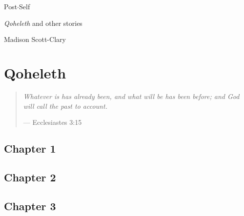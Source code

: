 \documentclass[11pt]{memoir}
\begin{document}
  \frontmatter

  

  \pagestyle{plain}

  \doublespacing

  \begin{flushright}
    \null
    \vfill
    {\Huge\DisplayFont Post$\cdot$Self}

    {\Large\DisplayFont \emph{Qoheleth} and other stories}

    \vfill

    {\Large\DisplayFont Madison Scott-Clary}
  \end{flushright}
  \thispagestyle{empty}

  \newpage

  

  \tableofcontents*
  \newpage
  \null
  \cleardoublepage

  \onehalfspacing


  \mainmatter

  \pagestyle{ourbook}

  \cleardoublepage
  \part*{Qoheleth}
  \null
  \thispagestyle{empty}
  \vfill
  \begin{quote}
    \emph{Whatever is has already been, and what will be has been before; and God will call the past to account.}

    --- Ecclesiastes 3:15
  \end{quote}
  \vfill
  \chapter*{Chapter 1}
  

  \chapter*{Chapter 2}
  

  \chapter*{Chapter 3}
  
\end{document}
